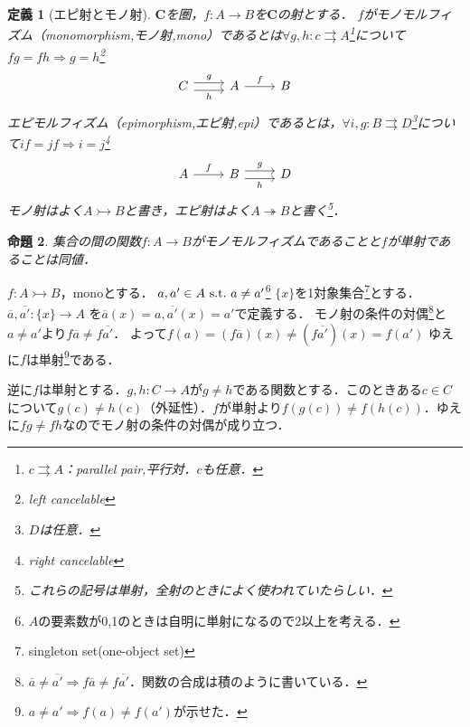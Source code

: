 \documentclass[dvipdfmx,a4j,10pt]{jsarticle}
\makeatletter
\theoremstyle{mystyle1}
\newtheorem{dfn}{定義}[section]
\newtheorem{prop}[dfn]{命題}
\theoremstyle{mystyle2}
\renewenvironment{proof}[1][\proofname]{\par
  \pushQED{\qed}%
  \normalfont
  \topsep6\p@\@plus6\p@ \trivlist
  \item[\hskip\labelsep{\bfseries\sffamily #1}]\ignorespaces
}{%
  \popQED\endtrivlist\@endpefalse
}
\renewcommand\proofname{証明}
\makeatother
\begin{document}
\setcounter{dfn}{0}

\begin{dfn}[エピ射とモノ射]
	$\mathbf{C}$を圏，$f:A\to B$を$\mathbf{C}$の射とする．
	$f$がモノモルフィズム（monomorphism,モノ射,mono）であるとは$\forall g,h:c\rightrightarrows A$\footnote{$c\rightrightarrows A$：parallel pair,平行対．$c$も任意．}について$fg=fh\Rightarrow g=h$\footnote{left cancelable}
	\begin{equation}
		\begin{tikzcd}
			C \arrow[r,yshift=0.7ex,"g"] \arrow[r,yshift=-0.7ex,"h"'] & A \arrow[r,"f"] & B
		\end{tikzcd}
	\end{equation}
	エピモルフィズム（epimorphism,エピ射,epi）であるとは，$\forall i,g:B\rightrightarrows D$\footnote{$D$は任意．}について$if=jf\Rightarrow i=j$\footnote{right cancelable}
	\begin{equation}
		\begin{tikzcd}
			A \arrow[r,"f"] & B \arrow[r,yshift=0.7ex,"g"] \arrow[r,yshift=-0.7ex,"h"'] & D
		\end{tikzcd}
	\end{equation}
	モノ射はよく$A\rightarrowtail B$と書き，エピ射はよく$A\twoheadrightarrow B$と書く\footnote{これらの記号は単射，全射のときによく使われていたらしい．}．
\end{dfn}

\begin{prop}
	集合の間の関数$f:A\to B$がモノモルフィズムであることと$f$が単射であることは同値．
\end{prop}

\begin{proof}
	$f:A\rightarrowtail B$，monoとする．
	$a,a'\in A\textrm{\,\,s.t.\,\,} a\neq a'$\footnote{$A$の要素数が0,1のときは自明に単射になるので2以上を考える．}
	$\{x\}$を1対象集合\footnote{singleton set(one-object set)}とする．
	$\overline{a},\overline{a'}:\{x\}\to A$
	を$\overline{a}(x)=a,\overline{a'}(x)=a'$で定義する．
	モノ射の条件の対偶\footnote{$\overline{a}\neq\overline{a'}\Rightarrow f\overline{a}\neq f\overline{a'}$．関数の合成は積のように書いている．}と$a\neq a'$より$f\overline{a}\neq f\overline{a'}$．
	よって$f(a)=(f\overline{a})(x)\neq(f\overline{a'})(x)=f(a')$
	ゆえに$f$は単射\footnote{$a\neq a'\Rightarrow f(a)\neq f(a')$が示せた．}である．

	逆に$f$は単射とする．$g,h:C\to A$が$g\neq h$である関数とする．このときある$c\in C$について$g(c)\neq h(c)$（外延性）．$f$が単射より$f(g(c))\neq f(h(c))$．ゆえに$fg\neq fh$なのでモノ射の条件の対偶が成り立つ．
\end{proof}
\end{document}
